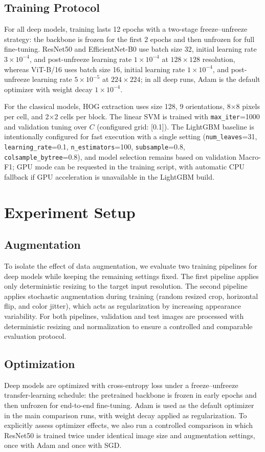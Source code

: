 \documentclass[11pt]{article}
\begin{document}
\subsection{Training Protocol}
For all deep models, training lasts 12 epochs with a two-stage freeze--unfreeze strategy: the backbone is frozen for the first 2 epochs and then unfrozen for full fine-tuning. ResNet50 and EfficientNet-B0 use batch size 32, initial learning rate $3\times10^{-4}$, and post-unfreeze learning rate $1\times10^{-4}$ at $128\times128$ resolution, whereas ViT-B/16 uses batch size 16, initial learning rate $1\times10^{-4}$, and post-unfreeze learning rate $5\times10^{-5}$ at $224\times224$; in all deep runs, Adam is the default optimizer with weight decay $1\times10^{-4}$.

For the classical models, HOG extraction uses size 128, 9 orientations, 8$\times$8 pixels per cell, and 2$\times$2 cells per block. The linear SVM is trained with \texttt{max\_iter}=1000 and validation tuning over $C$ (configured grid: [0.1]). The LightGBM baseline is intentionally configured for fast execution with a single setting (\texttt{num\_leaves}=31, \texttt{learning\_rate}=0.1, \texttt{n\_estimators}=100, \texttt{subsample}=0.8, \texttt{colsample\_bytree}=0.8), and model selection remains based on validation Macro-F1; GPU mode can be requested in the training script, with automatic CPU fallback if GPU acceleration is unavailable in the LightGBM build.

\section{Experiment Setup}
\subsection{Augmentation}
To isolate the effect of data augmentation, we evaluate two training pipelines for deep models while keeping the remaining settings fixed. The first pipeline applies only deterministic resizing to the target input resolution. The second pipeline applies stochastic augmentation during training (random resized crop, horizontal flip, and color jitter), which acts as regularization by increasing appearance variability. For both pipelines, validation and test images are processed with deterministic resizing and normalization to ensure a controlled and comparable evaluation protocol.

\subsection{Optimization}
Deep models are optimized with cross-entropy loss under a freeze--unfreeze transfer-learning schedule: the pretrained backbone is frozen in early epochs and then unfrozen for end-to-end fine-tuning. Adam is used as the default optimizer in the main comparison runs, with weight decay applied as regularization. To explicitly assess optimizer effects, we also run a controlled comparison in which ResNet50 is trained twice under identical image size and augmentation settings, once with Adam and once with SGD.
\end{document}
